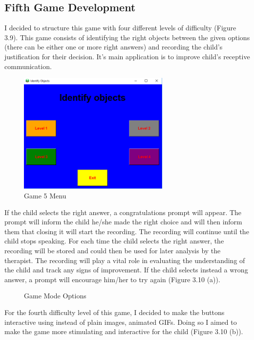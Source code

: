 \subsection{Fifth Game Development}
I decided to structure this game with four different levels of difficulty (Figure 3.9). This game consists of identifying the right objects between the given options (there can be either one or more right answers) and recording the child's justification for their decision. It's main application is to improve child's receptive communication. 

\begin{figure}[ht!]%
    \centering
    \includegraphics[width=7.5cm]{images/game3.PNG}%
    \caption{Game 5 Menu}
\end{figure}

If the child selects the right answer, a congratulations prompt will appear. The prompt will inform the child he/she made the right choice and will then inform them that closing it will start the recording. The recording will continue until the child stops speaking. For each time the child selects the right answer, the recording will be stored and could then be used for later analysis by the therapist. The recording will play a vital role in evaluating the understanding of the child and track any signs of improvement. If the child selects instead a wrong answer, a prompt will encourage him/her to try again (Figure 3.10 (a)). 

\begin{figure}[ht!]%
    \centering
    \qquad
    \caption{Game Mode Options}%
    \label{fig:example2}%
\end{figure}

For the fourth difficulty level of this game, I decided to make the buttons interactive using instead of plain images, animated GIFs. Doing so I aimed to make the game more stimulating and interactive for the child (Figure 3.10 (b)). 


